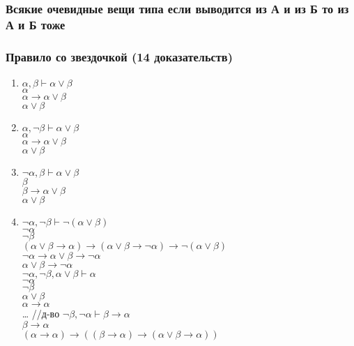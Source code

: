 \subsubsection{Всякие очевидные вещи типа если выводится из А и из Б то из А и Б тоже}
\label{sec-4-1-3}
\subsubsection{Правило со звездочкой (14 доказательств)}
\label{sec-4-1-4}
\begin{enumerate}
\item $\alpha, \beta \vdash \alpha \lor \beta$ \\
$\alpha$ \\
$\alpha \to \alpha \lor \beta$ \\
$\alpha \lor \beta$
\item $\alpha, \lnot \beta \vdash \alpha \lor \beta$ \\
$\alpha$ \\
$\alpha \to \alpha \lor \beta$ \\
$\alpha \lor \beta$
\item $\lnot \alpha, \beta \vdash \alpha \lor \beta$ \\
$\beta$ \\
$\beta \to \alpha \lor \beta$ \\
$\alpha \lor \beta$
\item $\lnot \alpha, \lnot \beta \vdash \lnot (\alpha \lor \beta)$ \\
$\lnot \alpha$ \\
$\lnot \beta$ \\
$(\alpha \lor \beta \to \alpha) \to (\alpha \lor \beta \to \lnot \alpha) \to \lnot (\alpha \lor \beta)$ \\
$\lnot \alpha \to \alpha \lor \beta \to \lnot \alpha$ \\
$\alpha \lor \beta \to \lnot \alpha$ \\
$\lnot \alpha, \lnot \beta, \alpha \lor \beta \vdash \alpha$ \\
$\lnot \alpha$ \\
$\lnot \beta$ \\
$\alpha \lor \beta$ \\
$\alpha \to \alpha$ \\
\ldots{} //д-во $\lnot \beta, \lnot \alpha \vdash \beta \to \alpha$ \\
$\beta \to \alpha$ \\
$(\alpha \to \alpha) \to ((\beta \to \alpha) \to (\alpha \lor \beta \to \alpha))$ \\

\end{enumerate}

